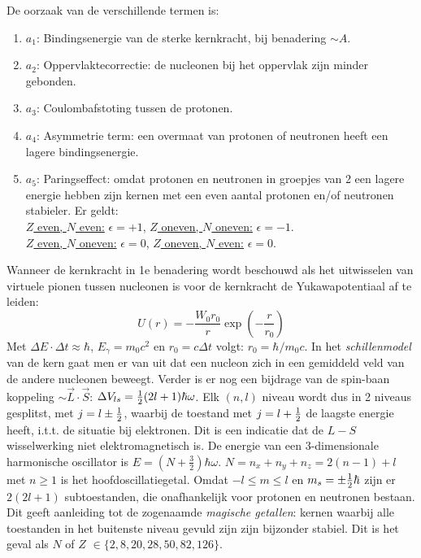 \documentclass[twoside]{report}
\begin{document}
De oorzaak van de verschillende termen is:
\begin{enumerate}
\item $a_1$: Bindingsenergie van de sterke kernkracht, bij benadering $\sim A$.
\item $a_2$: Oppervlaktecorrectie: de nucleonen bij het oppervlak zijn minder
             gebonden.
\item $a_3$: Coulombafstoting tussen de protonen.
\item $a_4$: Asymmetrie term: een overmaat van protonen of neutronen heeft een
             lagere bindingsenergie.
\item $a_5$: Paringseffect: omdat protonen en neutronen in groepjes van 2
             een lagere energie hebben zijn kernen met een even aantal
             protonen en/of neutronen stabieler. Er geldt:\\[2mm]
             \underline{$Z$ even, $N$ even:} $\epsilon=+1$,
             \underline{$Z$ oneven, $N$ oneven:} $\epsilon=-1$.\\
             \underline{$Z$ even, $N$ oneven:} $\epsilon=0$,
             \underline{$Z$ oneven, $N$ even:} $\epsilon=0$.
\end{enumerate}
Wanneer de kernkracht in 1e benadering wordt beschouwd als het uitwisselen
van virtuele pionen tussen nucleonen is voor de kernkracht de
Yukawapotentiaal af te leiden:
\[
U(r)=-\frac{W_0r_0}{r}\exp\left(-\frac{r}{r_0}\right)
\]
Met $\Delta E\cdot\Delta t\approx\hbar$, $E_\gamma=m_0c^2$ en $r_0=c\Delta t$
volgt: $r_0=\hbar/m_0c$.
\npar
In het {\it schillenmodel} van de kern gaat men er van uit dat een nucleon
zich in een gemiddeld veld van de andere nucleonen beweegt. Verder is er
nog een bijdrage van de spin-baan koppeling $\sim\vec{L}\cdot\vec{S}$:
$\Delta V_{ls}=\mbox{$\frac{1}{2}$}(2l+1)\hbar\omega$. Elk $(n,l)$ niveau wordt dus in
2 niveaus gesplitst, met $j=l\pm\mbox{$\frac{1}{2}$}$, waarbij de toestand met $j=l+\mbox{$\frac{1}{2}$}$
de laagste energie heeft, i.t.t. de situatie bij elektronen. Dit is een
indicatie dat de $L-S$ wisselwerking niet elektromagnetisch is. De energie
van een 3-dimensionale harmonische oscillator is $E=(N+\frac{3}{2})\hbar\omega$.
$N=n_x+n_y+n_z=2(n-1)+l$ met $n\geq1$ is het hoofdoscillatiegetal. Omdat
$-l\leq m\leq l$ en $m_s=\pm\mbox{$\frac{1}{2}$}\hbar$ zijn er $2(2l+1)$ subtoestanden, die
onafhankelijk voor protonen en neutronen bestaan. Dit geeft aanleiding tot de
zogenaamde {\it magische getallen}: kernen waarbij alle toestanden in het
buitenste niveau gevuld zijn zijn bijzonder stabiel. Dit is het geval als
$N$ of $Z$ $\in\{2,8,20,28,50,82,126\}$.
\end{document}
